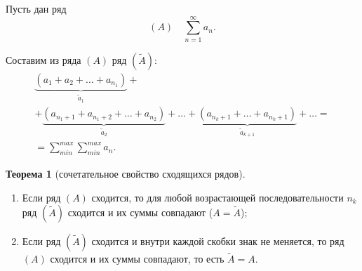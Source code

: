 \documentclass{report}
\theoremstyle{definition}
\newtheorem{theorem}{Теорема}[section]
\begin{document}
Пусть дан ряд
\begin{equation*}
  (A) \quad \sum_{n=1}^{\infty}a_n.
\end{equation*}

Составим из ряда $(A)$ ряд $(\widetilde{A})$:
\begin{multline*}
  \underbrace{(a_1 + a_2 + \ldots + a_{n_1})}_{\widetilde{a}_1} + \\
  + \underbrace{(a_{n_1 + 1} + a_{n_1 + 2} + \ldots + a_{n_2})}_{\widetilde{a}_2} + \ldots + \underbrace{(a_{n_k + 1} + \ldots + a_{n_k + 1})}_{\widetilde{a}_{k+1}} + \ldots = \\
  = \sum_{min}^{max}\sum_{min}^{max} a_n.
\end{multline*}

\begin{theorem}[сочетательное свойство сходящихся рядов]
  \begin{enumerate}
    \item Если ряд $(A)$ сходится, то для любой возрастающей последовательности $n_k$ ряд $(\widetilde{A})$ сходится и их суммы совпадают ($A = \widetilde{A}$);
    \item Если ряд $(\widetilde{A})$ сходится и внутри каждой  скобки знак не меняется, то ряд $(A)$ сходится и их суммы совпадают, то есть $\widetilde{A} = A$.
  \end{enumerate}
\end{theorem}
\end{document}
